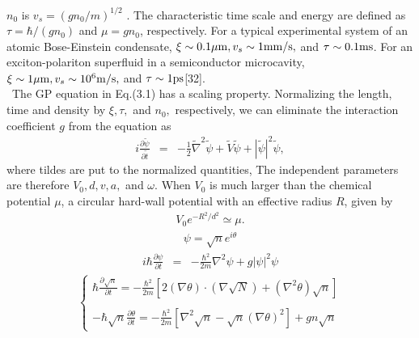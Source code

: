 \documentclass[12pt,a4paper]{report}
\begin{document}
$n_0$ is $v_s =(g n_0 / m)^{1/2}$ . The characteristic time scale and energy are
defined as $\tau = \hbar/(g n_0)$ and $\mu = g n_0$, respectively.
For a typical experimental system of an atomic Bose-Einstein condensate, $\xi \sim 0.1 {\rm \mu m},
v_s \sim 1 {\rm mm/s},$ and $\tau \sim 0.1 {\rm ms}$. For an exciton-polariton
superfluid in a semiconductor microcavity, $\xi \sim 1 {\rm \mu m}, v_s \sim 10^6 {\rm m/s},$
and $\tau \sim 1 {\rm ps}$[32].
\\
\ The GP equation in Eq.(3.1) has a scaling property. Normalizing the length, time and density 
by $\xi,\tau,$ and $n_0,$ respectively, we can eliminate the interaction coefficient $g$
from the equation as 
\begin{eqnarray}
i \frac{\partial \tilde{\psi}}{\partial \tilde{t}}
& = & -\frac{1}{2} \tilde{\nabla}^2 \tilde{\psi} + \tilde{V} \tilde{\psi} + |\tilde{\psi}|^2 \tilde{\psi},
\end{eqnarray}
where tildes are put to the normalized quantities, The independent parameters are therefore
$V_0, d, v, a,$ and $\omega$.
When $V_0$ is much larger than the chemical potential $\mu$, a circular hard-wall potential
with an effective radius $R$, given by
\begin{eqnarray}
V_0 e^{-R^2/d^2} \simeq \mu.
\end{eqnarray}
\begin{eqnarray}
\psi = \sqrt{n} e^{i \theta}
\end{eqnarray}
\begin{eqnarray}
i \hbar \frac{\partial \psi}{\partial t} & = & -\frac{\hbar^2}{2m} \nabla^2 \psi + g | \psi |^2 \psi
\end{eqnarray}
\begin{eqnarray}
\left \{
\begin{array}{l}
\displaystyle \hbar \frac{\partial \sqrt{n}}{\partial t} = - \frac{\hbar^2}{2m} \left[ 2 \left(\nabla \theta \right) \cdot \left( \nabla \sqrt{N} \right) + \left( \nabla^2 \theta \right) \sqrt{n} \right]
\\
\\
\displaystyle -\hbar \sqrt{n} \frac{\partial \theta}{\partial t} = - \frac{\hbar^2}{2m} \left[ \nabla^2 \sqrt{n} - \sqrt{n} \left( \nabla \theta \right)^2 \right] + gn \sqrt{n}
\end{array}
\right.
\end{eqnarray}
\end{document}
